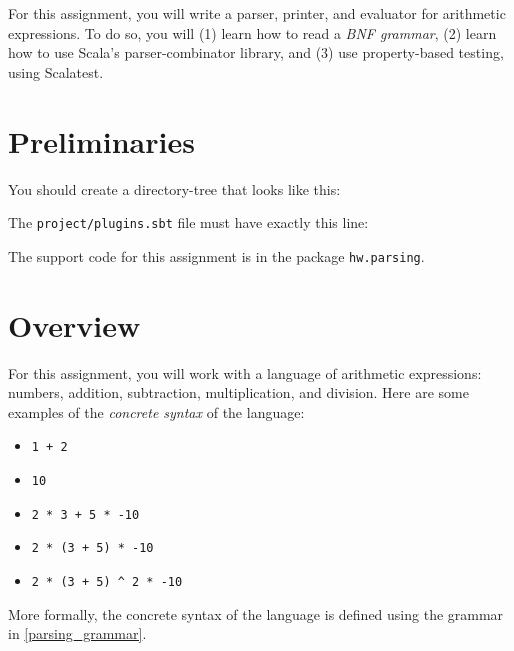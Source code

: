 
For this assignment, you will write a parser, printer, and evaluator for arithmetic expressions.  To do so, you will (1) learn how to read a \emph{BNF grammar}, (2) learn how to use Scala's parser-combinator library, and (3) use property-based testing, using Scalatest.

\section{Preliminaries}

You should create a directory-tree that looks like this:


The \texttt{project/plugins.sbt} file must have exactly this line:


The support code for this assignment is in the package \texttt{hw.parsing}.

\section{Overview}

For this assignment, you will work with a language of arithmetic expressions: numbers, addition, subtraction, multiplication, and division. Here are some examples of the \emph{concrete syntax} of the language:

\begin{itemize}
  \item \texttt{1 + 2}
  \item \texttt{10}
  \item \texttt{2 * 3 + 5 * -10}
  \item \texttt{2 * (3 + 5) * -10}
  \item \verb|2 * (3 + 5) ^ 2 * -10|
\end{itemize}

More formally, the concrete syntax of the language is defined using the grammar in \cref{parsing_grammar}.

